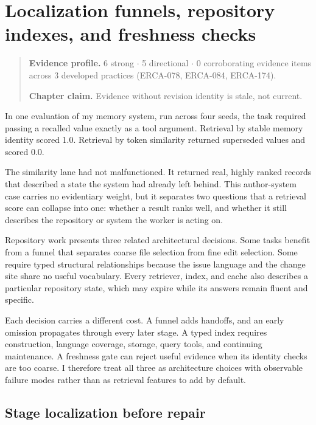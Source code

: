 \chapter{Localization funnels, repository indexes, and freshness checks}
\label{ch12-localization-funnels-repository-indexes-freshness-checks}
\begin{quote}
\textbf{Evidence profile.} 6 strong \(\cdot\) 5 directional \(\cdot\) 0 corroborating evidence items across 3 developed practices (ERCA-078, ERCA-084, ERCA-174).

\textbf{Chapter claim.} Evidence without revision identity is stale, not current.
\end{quote}

In one evaluation of my memory system, run across four seeds, the task required passing a recalled value exactly as a tool argument. Retrieval by stable memory identity scored 1.0. Retrieval by token similarity returned superseded values and scored 0.0.

The similarity lane had not malfunctioned. It returned real, highly ranked records that described a state the system had already left behind. This author-system case carries no evidentiary weight, but it separates two questions that a retrieval score can collapse into one: whether a result ranks well, and whether it still describes the repository or system the worker is acting on.

Repository work presents three related architectural decisions. Some tasks benefit from a funnel that separates coarse file selection from fine edit selection. Some require typed structural relationships because the issue language and the change site share no useful vocabulary. Every retriever, index, and cache also describes a particular repository state, which may expire while its answers remain fluent and specific.

Each decision carries a different cost. A funnel adds handoffs, and an early omission propagates through every later stage. A typed index requires construction, language coverage, storage, query tools, and continuing maintenance. A freshness gate can reject useful evidence when its identity checks are too coarse. I therefore treat all three as architecture choices with observable failure modes rather than as retrieval features to add by default.

\hypertarget{stage-localization-before-repair}{%
\section{Stage localization before repair}\label{stage-localization-before-repair}}

